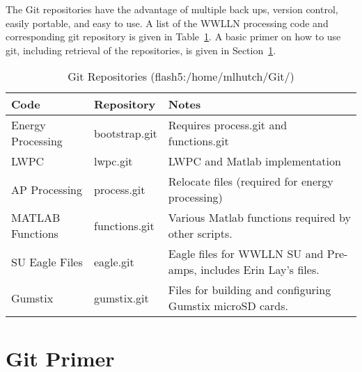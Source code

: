 The Git repositories have the advantage of multiple back ups, version control, easily portable, and easy to use.
A list of the WWLLN processing code and corresponding git repository is given in Table~\ref{code:table:repo}.
A basic primer on how to use git, including retrieval of the repositories, is given in Section~\ref{code:section:primer}.

\begin{table}[h!]
\caption{Git Repositories (flash5:/home/mlhutch/Git/)}
\begin{center}
\begin{tabular}{|p{1.5in}|p{1.25in}|p{3in}|}

\hline
{\bf Code} &	{\bf Repository} &	{\bf Notes}\\

\hline
\rule{0pt}{3ex}
Energy Processing	&bootstrap.git	&	Requires process.git and functions.git \\ 


\hline
\rule{0pt}{3ex}
LWPC	&lwpc.git	&	LWPC and Matlab implementation\\ 

\hline
\rule{0pt}{3ex}
AP Processing	&process.git	&	Relocate files (required for energy processing)\\ 

\hline
\rule{0pt}{3ex}
MATLAB Functions	&functions.git	&	Various Matlab functions required by other scripts.\\ 

\hline
\rule{0pt}{3ex}
SU Eagle Files	&eagle.git	&	Eagle files for WWLLN SU and Pre-amps, includes Erin Lay's files.\\ 

\hline
\rule{0pt}{3ex}
Gumstix	&gumstix.git	&	Files for building and configuring Gumstix microSD cards.\\ 


\hline
\end{tabular}
\end{center}
\label{code:table:repo}
\end{table}

\section{Git Primer}
\label{code:section:primer}

